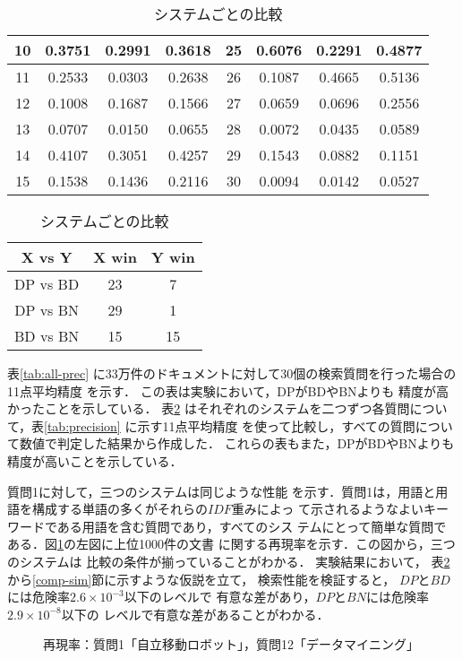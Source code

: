 \begin{table}[htb]
\begin{center}
\begin{tabular}{|c||c|c|c||c||c|c|c|}
10 & 0.3751 & 0.2991 & 0.3618 & 25 & 0.6076 & 0.2291 & 0.4877\\ \hline
11 & 0.2533 & 0.0303 & 0.2638 & 26 & 0.1087 & 0.4665 & 0.5136\\ \hline
12 & 0.1008 & 0.1687 & 0.1566 & 27 & 0.0659 & 0.0696 & 0.2556\\ \hline
13 & 0.0707 & 0.0150 & 0.0655 & 28 & 0.0072 & 0.0435 & 0.0589\\ \hline
14 & 0.4107 & 0.3051 & 0.4257 & 29 & 0.1543 & 0.0882 & 0.1151\\ \hline
15 & 0.1538 & 0.1436 & 0.2116 & 30 & 0.0094 & 0.0142 & 0.0527\\ \hline
\end{tabular}
\end{center}
\vspace{-0.3em}
\caption{システムごとの比較}
\vspace{-1.2em}
\label{tab:comparison}
\begin{center}
\begin{tabular}{|c||c|c|}\hline
{X vs Y}&{X win}&{Y win}\\\hline\hline
{DP vs BD} & 23  & 7\\\hline
{DP vs BN} & 29 & 1 \\\hline
{BD vs BN} &  15 & 15 \\\hline
\end{tabular}
\end{center}
\end{table}
表\ref{tab:all-prec}
に33万件のドキュメントに対して30個の検索質問を行った場合の11点平均精度
を示す．
この表は実験において，DPがBDやBNよりも
精度が高かったことを示している．
表\ref{tab:comparison}
はそれぞれのシステムを二つずつ各質問について，表\ref{tab:precision}
に示す11点平均精度
を使って比較し，すべての質問について数値で判定した結果から作成した．
これらの表もまた，DPがBDやBNよりも精度が高いことを示している．

質問1に対して，三つのシステムは同じような性能
を示す．質問1は，用語と用語を構成する単語の多くがそれらの$IDF$重みによっ
て示されるようなよいキーワードである用語を含む質問であり，すべてのシス
テムにとって簡単な質問である．図\ref{fig:recall1and12}の左図に上位1000件の文書
に関する再現率を示す．この図から，三つのシステムは
比較の条件が揃っていることがわかる．
実験結果において，
表\ref{tab:comparison}から\ref{comp-sim}節に示すような仮説を立て，
検索性能を検証すると，
$DP$と$BD$には危険率$2.6 \times 10^{-3}$以下のレベルで
有意な差があり，$DP$と$BN$には危険率$2.9 \times 10^{-8}$以下の
レベルで有意な差があることがわかる．
\begin{figure}[htb]
\begin{center}
\caption{再現率：質問1「自立移動ロボット」，質問12「データマイニング」}
\label{fig:recall1and12}
\end{center}
\vspace{-3em}
\end{figure}

